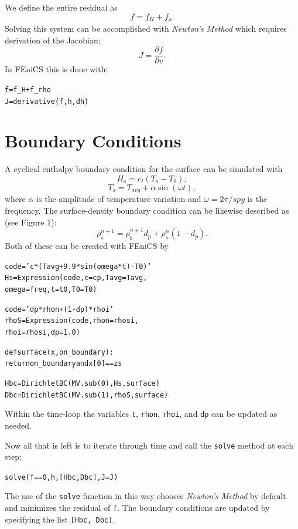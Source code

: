 \documentclass{article}%
\begin{document}
We define the entire residual as 
  $$
    f = f_H + f_{\rho}.
  $$
Solving this system can be accomplished with \emph{Newton's Method} which requires derivation of the Jacobian:
  $$
    J = \frac{\partial f}{\partial v}.
  $$
In FEniCS this is done with:
\footnotesize
\begin{alltt}
f  = f_H + f_rho
J  = derivative(f, h, dh)
\end{alltt}
\normalsize


\section{Boundary Conditions}

A cyclical enthalpy boundary condition for the surface can be simulated with 
  $$
    H_s = c_i ( T_s - T_0 ),
  $$
  $$
    T_s = T_{avg} + \alpha \sin(\omega t),
  $$
where $\alpha$ is the amplitude of temperature variation and $\omega = 2\pi / spy$ is the frequency.  The surface-density boundary condition can be likewise described as (see Figure 1): 
  $$
    \rho_s^{n+1} = \rho_{\dot{b}}^{n+1} d_p + \rho_s^{n} (1 - d_p).
  $$
Both of these can be created with FEniCS by
\footnotesize
\begin{alltt}
code = 'c*(Tavg + 9.9*sin(omega*t) - T0)'
Hs   = Expression(code, c=cp, Tavg=Tavg, 
                  omega=freq, t=t0, T0=T0)

code = 'dp*rhon + (1 - dp)*rhoi'
rhoS = Expression(code, rhon=rhosi, 
                  rhoi=rhosi, dp=1.0)

def surface(x, on_boundary):
  return on_boundary and x[0] == zs

Hbc  = DirichletBC(MV.sub(0), Hs, surface)
Dbc  = DirichletBC(MV.sub(1), rhoS, surface)
\end{alltt}
\normalsize
Within the time-loop the variables \texttt{t}, \texttt{rhon}, \texttt{rhoi}, and \texttt{dp} can be updated as needed.

Now all that is left is to iterate through time and call the \texttt{solve} method at each step:\par
\footnotesize
\begin{alltt}
solve(f == 0, h, [Hbc, Dbc], J=J)
\end{alltt}
\normalsize
The use of the \texttt{solve} function in this way chooses \emph{Newton's Method} by default and minimizes the residual of \texttt{f}.  The boundary conditions are updated by specifying the list \texttt{[Hbc, Dbc]}.
\end{document}
